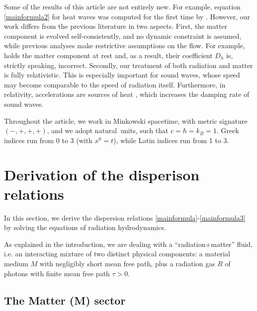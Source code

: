 \documentclass[a4paper, amsfonts, amssymb, amsmath, reprint, showkeys, nofootinbib, twoside,notitlepage,onecolumn]{revtex4-2}
\theoremstyle{definition}
\theoremstyle{theorem}
\theoremstyle{corollary}
\begin{document}
Some of the results of this article are not entirely new. For example, equation \eqref{mainformula2} for heat waves was computed for the first time by \citet{Spiegel1957}. However, our work differs from the previous literature in two aspects. First, the matter component is evolved self-consistently, and no dynamic constraint is assumed, while previous analyses make restrictive assumptions on the flow. For example, \citet{Spiegel1957} holds the matter component at rest and, as a result, their coefficient $D_h$ is, strictly speaking, incorrect. Secondly, our treatment of both radiation and matter is fully relativistic. This is especially important for sound waves, whose speed may become comparable to the speed of radiation itself. Furthermore, in relativity, accelerations are sources of heat \cite{Eckart40,GavassinoLyapunov_2020}, which increases the damping rate of sound waves.



Throughout the article, we work in Minkowski spacetime, with metric signature $(-,+,+,+)$, and we adopt natural\ units, such that $c=\hbar=k_B=1$. Greek indices run from 0 to 3 (with $x^0=t$), while Latin indices run from 1 to 3.


\section{Derivation of the disperison relations}\label{derivZia}

In this section, we derive the dispersion relations \eqref{mainformula}-\eqref{mainformula3} by solving the equations of radiation hydrodynamics.

As explained in the introduction, we are dealing with a ``radiation+matter'' fluid, i.e. an interacting mixture of two distinct physical components: a material medium $M$ with negligibly short mean free path, plus a radiation gas $R$ of photons with finite mean free path $\tau>0$. 



\subsection{The Matter (M) sector}\label{Mmmmm}
\end{document}
